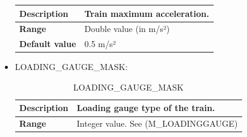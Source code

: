 \documentclass{template/openetcs}
\begin{document}
\begin{itemize}
\begin{longtable}{|l|l|}
					\begin{minipage}[t]{0.22\linewidth} \textbf{Description}	\end{minipage} 
				&	\begin{minipage}[t]{0.78\linewidth} Train maximum acceleration. \end{minipage} \\
				
				\hline
																																									
					\begin{minipage}[t]{0.22\linewidth} \textbf{Range}	\end{minipage} 
				&	\begin{minipage}[t]{0.78\linewidth} Double value (in m/s²) \end{minipage} \\
				
				\hline
				
					\begin{minipage}[t]{0.22\linewidth} \textbf{Default value}	\end{minipage} 
				&	\begin{minipage}[t]{0.78\linewidth} 0.5 m/s² \end{minipage} \\
				
				\hline
				
			\end{longtable}
			
		\item LOADING\_GAUGE\_MASK:
																													
			\begin{longtable}{|l|l|}
				\caption{LOADING\_GAUGE\_MASK}\\ 
				\hline
				
					\begin{minipage}[t]{0.22\linewidth} \textbf{Description}	\end{minipage} 
				&	\begin{minipage}[t]{0.78\linewidth} Loading gauge type of the train. \end{minipage} \\
				
				\hline
																																									
					\begin{minipage}[t]{0.22\linewidth} \textbf{Range}	\end{minipage} 
				&	\begin{minipage}[t]{0.78\linewidth} Integer value. See (M\_LOADINGGAUGE) \end{minipage} \\
				

\end{longtable}
\end{itemize}
\end{document}
